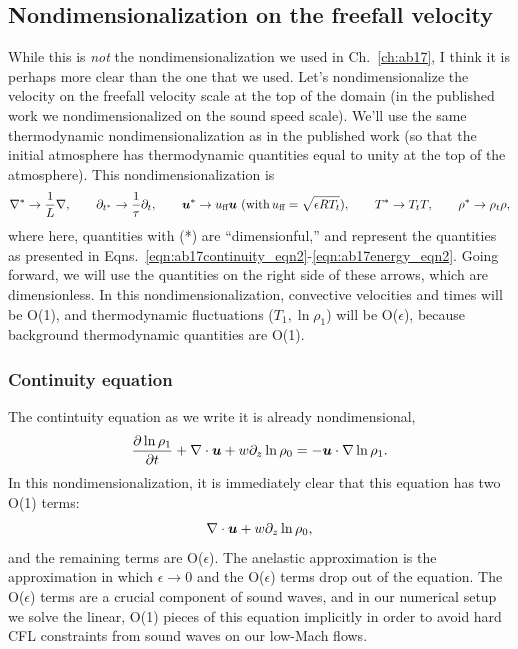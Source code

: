 \subsection{Nondimensionalization on the freefall velocity}
While this is \emph{not} the nondimensionalization we used in Ch.~\ref{ch:ab17}, I think it is perhaps more clear than the one that we used.
Let's nondimensionalize the velocity on the freefall velocity scale at the top of the domain (in the published work we nondimensionalized on the sound speed scale).
We'll use the same thermodynamic nondimensionalization as in the published work (so that the initial atmosphere has thermodynamic quantities equal to unity at the top of the atmosphere).
This nondimensionalization is
$$
\nabla^* \rightarrow \frac{1}{L}\nabla,\qquad
\partial_{t^*} \rightarrow \frac{1}{\tau}\partial_t, \qquad
\bm{u}^* \rightarrow u_{\text{ff}}\bm{u}\,\,(\text{with}\, u_{\text{ff}} = \sqrt{\epsilon R T_t}), \qquad
T^* \rightarrow T_t T,\qquad
\rho^* \rightarrow \rho_t \rho,
$$
where here, quantities with (*) are ``dimensionful,'' and represent the quantities as presented in Eqns.~\ref{eqn:ab17continuity_eqn2}-\ref{eqn:ab17energy_eqn2}.
Going forward, we will use the quantities on the right side of these arrows, which are dimensionless.
In this nondimensionalization, convective velocities and times will be O(1), and thermodynamic fluctuations ($T_1, \ln\rho_1$) will be O($\epsilon$), because background thermodynamic quantities are O(1).

\subsubsection{Continuity equation}
The contintuity equation as we write it is already nondimensional,
\begin{equation}
\frac{\partial \ln\rho_1}{\partial t} + \nabla\cdot\bm{u} + w\partial_z \ln\rho_0 = -\bm{u}\cdot\nabla\ln\rho_1.
\end{equation}
In this nondimensionalization, it is immediately clear that this equation has two O(1) terms:
$$
\nabla\cdot\bm{u} + w\partial_z \ln\rho_0,
$$
and the remaining terms are O($\epsilon$).
The anelastic approximation is the approximation in which $\epsilon \rightarrow 0$ and the O($\epsilon$) terms drop out of the equation.
The O($\epsilon$) terms are a crucial component of sound waves, and in our numerical setup we solve the linear, O(1) pieces of this equation implicitly in order to avoid hard CFL constraints from sound waves on our low-Mach flows.


